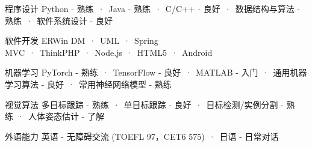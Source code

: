 

\begin{cvskills}
  \cvskill
    {程序设计} %
    {Python - 熟练\ ·\ Java - 熟练\ ·\ C/C++ - 良好\ ·\ 数据结构与算法 - 熟练\ ·\ 软件系统设计 - 良好} %
    
  \cvskill
    {软件开发} %
    {ERWin DM\ ·\ UML\ ·\ Spring MVC\ ·\ ThinkPHP\ ·\ Node.js\ ·\ HTML5\ ·\ Android} %

  \cvskill
    {机器学习} %
    {PyTorch - 熟练\ ·\ TensorFlow - 良好\ ·\ MATLAB - 入门\ ·\ 通用机器学习算法 - 良好\ ·\ 常用神经网络模型 - 熟练} %
    
  \cvskill
    {视觉算法} %
    {多目标跟踪 - 熟练\ ·\ 单目标跟踪 - 良好\ ·\ 目标检测/实例分割 - 熟练\ ·\ 人体姿态估计 - 了解} %
    
  \cvskill
    {外语能力} %
    {英语 - 无障碍交流 (TOEFL 97，CET6 575)\ ·\ 日语 - 日常对话} %
    

\end{cvskills}